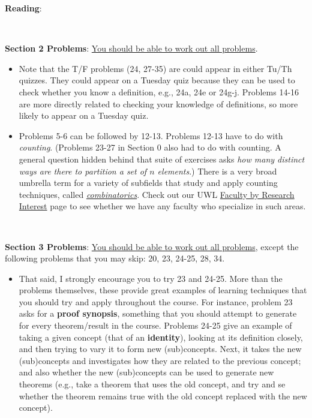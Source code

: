 \documentclass[12pt]{article}
\begin{document}
	
	{\bf Reading}: 
	
	\
	
	{\bf Section 2 Problems}: \underline{You should be able to work out all problems}. 
	\begin{itemize}
		\item Note that the T/F problems (24, 27-35) are could appear in either Tu/Th quizzes. They could appear on a Tuesday quiz because they can be used to check whether you know a definition, e.g., 24a, 24e or 24g-j. Problems 14-16 are more directly related to checking your knowledge of definitions, so more likely to appear on a Tuesday quiz.
		
		\item Problems 5-6 can be followed by 12-13. Problems 12-13 have to do with {\it counting}. (Problems 23-27 in Section 0 also had to do with counting. A general question hidden behind that suite of exercises asks {\it how many distinct ways are there to partition a set of $n$ elements}.) There is a very broad umbrella term for a variety of subfields that study and apply counting techniques, called \href{https://en.wikipedia.org/wiki/Combinatorics}{{\it combinatorics}}. Check out our UWL \href{https://www.uwlax.edu/mathematics/research/faculty-by-research-interest/}{Faculty by Research Interest} page to see whether we have any faculty who specialize in such areas.
	\end{itemize}
	
	\
	
	{\bf Section 3 Problems}: \underline{You should be able to work out all problems}, except the following problems that you may skip: 20, 23, 24-25, 28, 34. 
	
	\begin{itemize}
		\item That said, I strongly encourage you to try 23 and 24-25. More than the problems themselves, these provide great examples of learning techniques that you should try and apply throughout the course. For instance, problem 23 asks for a {\bf proof synopsis}, something that you should attempt to generate for every theorem/result in the course. Problems 24-25 give an example of taking a given concept (that of an {\bf identity}), looking at its definition closely, and then trying to vary it to form new (sub)concepts. Next, it  takes the new (sub)concepts and investigates how they are related to the previous concept; and also whether the new (sub)concepts can be used to generate new theorems (e.g., take a theorem that uses the old concept, and try and se whether the theorem remains true with the old concept replaced with the new concept).
	\end{itemize}
	
\end{document}
